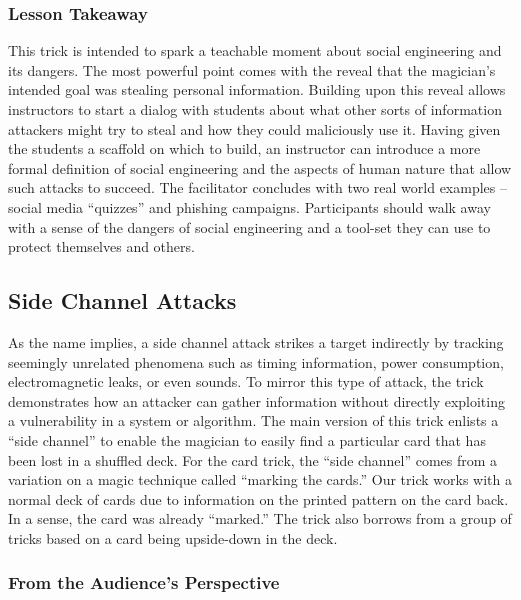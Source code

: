 %

\subsubsection{Lesson Takeaway}

This trick is intended to spark a teachable moment about
social engineering and
its dangers.
The most powerful point comes with the reveal that the magician's
intended goal was stealing personal information.
Building upon this reveal allows instructors to start a dialog with
students about what other
sorts of information attackers might try to steal and
how they could maliciously use it.
Having given the students a scaffold on which to build,
an instructor can
introduce a more formal definition of social engineering
and the aspects of human nature that allow such attacks to succeed.
The facilitator concludes with two real world examples --
social media ``quizzes'' and phishing campaigns.
Participants should walk away with a sense of the
dangers of social engineering and a tool-set they can use to protect
themselves and others.

\subsection{Side Channel Attacks}

As the name implies, a side channel attack strikes a target indirectly
by tracking seemingly unrelated phenomena
such as timing information, power consumption, electromagnetic leaks, or even
sounds.  To mirror this type of attack, the trick
demonstrates how an attacker can
gather information without directly exploiting
a vulnerability in a system or algorithm.
The main version of this trick enlists a ``side channel'' to
enable the magician to easily
find a particular card that has been lost in a shuffled deck.
For the card trick, the ``side channel'' comes from a variation on a magic
technique called ``marking the cards.''  Our trick works with a normal deck
of cards due to information on the printed pattern on the card back.  In a
sense, the card was already ``marked.''  The trick also borrows from a
group of tricks based on a card being upside-down in the deck.

\subsubsection{From the Audience's Perspective}

